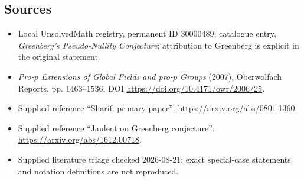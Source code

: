 \documentclass[11pt]{article}
\begin{document}
\subsection{Sources}
\begin{itemize}
\item Local UnsolvedMath registry, permanent ID 30000489, catalogue entry, \emph{Greenberg's Pseudo-Nullity Conjecture}; attribution to Greenberg is explicit in the original statement.
\item \emph{Pro-\(p\) Extensions of Global Fields and pro-\(p\) Groups} (2007), Oberwolfach Reports, pp. 1463--1536, DOI \url{https://doi.org/10.4171/owr/2006/25}.
\item Supplied reference ``Sharifi primary paper'': \url{https://arxiv.org/abs/0801.1360}.
\item Supplied reference ``Jaulent on Greenberg conjecture'': \url{https://arxiv.org/abs/1612.00718}.
\item Supplied literature triage checked 2026-08-21; exact special-case statements and notation definitions are not reproduced.
\end{itemize}
\end{document}
